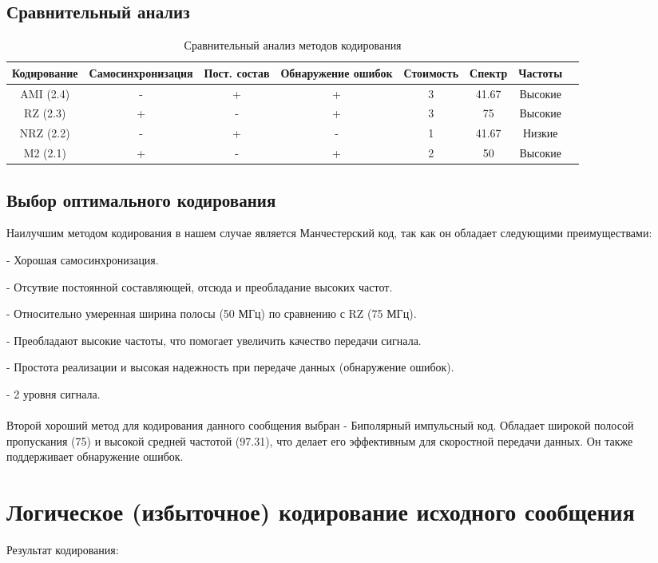 \documentclass{article}
\begin{document}
\subsection{Сравнительный анализ}
\begin{table}[h]
    \centering
    \caption{Сравнительный анализ методов кодирования}
    \begin{tabular}{|c|c|c|c|c|c|c|c|}
        \hline
        Кодирование & Самосинхронизация & Пост. состав & Обнаружение ошибок & Стоимость & Спектр & Частоты \\
        \hline
        AMI (2.4) & - & + & + & 3 & 41.67 & Высокие  \\
        \hline
        RZ (2.3) & + & - & + & 3 & 75 & Высокие  \\
        \hline
        NRZ (2.2) & - & + & - & 1 & 41.67 & Низкие  \\
        \hline
        M2 (2.1) & + & - & + & 2 & 50 & Высокие  \\
        \hline
    \end{tabular}
    \label{tab:coding_comparison}
\end{table}

\subsection{Выбор оптимального кодирования}
Наилучшим методом кодирования в нашем случае является Манчестерский код, 
так как он обладает следующими преимуществами:

- Хорошая самосинхронизация.

- Отсутвие постоянной составляющей, отсюда и преобладание высоких частот.

- Относительно умеренная ширина полосы (50 МГц) по сравнению с RZ (75 МГц).

- Преобладают высокие частоты, что помогает увеличить качество передачи сигнала.

- Простота реализации и высокая надежность при передаче данных (обнаружение ошибок).

- 2 уровня сигнала.
\\ \\
Второй хороший метод для кодирования данного сообщения выбран - Биполярный импульсный код.
Обладает широкой полосой пропускания (75) и высокой средней частотой (97.31), что делает его эффективным для скоростной передачи данных. Он также поддерживает обнаружение ошибок.

\section{Логическое (избыточное) кодирование исходного сообщения}
Результат кодирования: 
\end{document}
